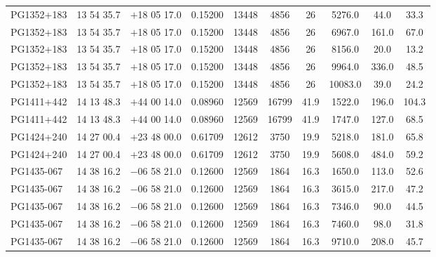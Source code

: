 \begin{landscape}
\begin{center}
\begin{longtable}{l c c c c c c c c c}
PG1352+183  &              13 54 35.7  &         $+$18 05 17.0  &       0.15200  & 13448  &   4856  &       26  &        5276.0  &  44.0  &   33.3  \\
PG1352+183  &              13 54 35.7  &         $+$18 05 17.0  &       0.15200  & 13448  &   4856  &       26  &        6967.0  &  161.0  &  67.0  \\
PG1352+183  &              13 54 35.7  &         $+$18 05 17.0  &       0.15200  & 13448  &   4856  &       26  &        8156.0  &  20.0  &   13.2  \\
PG1352+183  &              13 54 35.7  &         $+$18 05 17.0  &       0.15200  & 13448  &   4856  &       26  &        9964.0  &  336.0  &  48.5  \\
PG1352+183  &              13 54 35.7  &         $+$18 05 17.0  &       0.15200  & 13448  &   4856  &       26  &        10083.0  & 39.0  &   24.2  \\
PG1411+442  &              14 13 48.3  &         $+$44 00 14.0  &       0.08960  & 12569  &   16799  &      41.9  &      1522.0  &  196.0  &  104.3  \\
PG1411+442  &              14 13 48.3  &         $+$44 00 14.0  &       0.08960  & 12569  &   16799  &      41.9  &      1747.0  &  127.0  &  68.5  \\
PG1424+240  &              14 27 00.4  &         $+$23 48 00.0  &       0.61709  & 12612  &   3750  &       19.9  &      5218.0  &  181.0  &  65.8  \\
PG1424+240  &              14 27 00.4  &         $+$23 48 00.0  &       0.61709  & 12612  &   3750  &       19.9  &      5608.0  &  484.0  &  59.2  \\
PG1435-067  &              14 38 16.2  &         $-$06 58 21.0  &       0.12600  & 12569  &   1864  &       16.3  &      1650.0  &  113.0  &  52.6  \\
PG1435-067  &              14 38 16.2  &         $-$06 58 21.0  &       0.12600  & 12569  &   1864  &       16.3  &      3615.0  &  217.0  &  47.2  \\
PG1435-067  &              14 38 16.2  &         $-$06 58 21.0  &       0.12600  & 12569  &   1864  &       16.3  &      7346.0  &  90.0  &   44.5  \\
PG1435-067  &              14 38 16.2  &         $-$06 58 21.0  &       0.12600  & 12569  &   1864  &       16.3  &      7460.0  &  98.0  &   31.8  \\
PG1435-067  &              14 38 16.2  &         $-$06 58 21.0  &       0.12600  & 12569  &   1864  &       16.3  &      9710.0  &  208.0  &  45.7  \\

\end{longtable}
\end{center}
\end{landscape}

